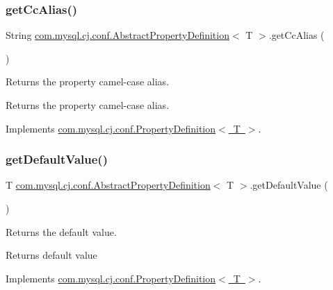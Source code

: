 \subsubsection{\texorpdfstring{get\+Cc\+Alias()}{getCcAlias()}}
{\footnotesize\ttfamily String \mbox{\hyperlink{classcom_1_1mysql_1_1cj_1_1conf_1_1_abstract_property_definition}{com.\+mysql.\+cj.\+conf.\+Abstract\+Property\+Definition}}$<$ T $>$.get\+Cc\+Alias (\begin{DoxyParamCaption}{ }\end{DoxyParamCaption})}

Returns the property camel-\/case alias.

\begin{DoxyReturn}{Returns}
the property camel-\/case alias. 
\end{DoxyReturn}


Implements \mbox{\hyperlink{interfacecom_1_1mysql_1_1cj_1_1conf_1_1_property_definition_acc0fa0247711c6fdacc8eff41cf31259}{com.\+mysql.\+cj.\+conf.\+Property\+Definition$<$ T $>$}}.

\mbox{\label{classcom_1_1mysql_1_1cj_1_1conf_1_1_abstract_property_definition_a3ed1c7b670a446214f7e08b450c8688c}} 
\subsubsection{\texorpdfstring{get\+Default\+Value()}{getDefaultValue()}}
{\footnotesize\ttfamily T \mbox{\hyperlink{classcom_1_1mysql_1_1cj_1_1conf_1_1_abstract_property_definition}{com.\+mysql.\+cj.\+conf.\+Abstract\+Property\+Definition}}$<$ T $>$.get\+Default\+Value (\begin{DoxyParamCaption}{ }\end{DoxyParamCaption})}

Returns the default value.

\begin{DoxyReturn}{Returns}
default value 
\end{DoxyReturn}


Implements \mbox{\hyperlink{interfacecom_1_1mysql_1_1cj_1_1conf_1_1_property_definition_a8e30238016964be2b882a2a9cbffc6a1}{com.\+mysql.\+cj.\+conf.\+Property\+Definition$<$ T $>$}}.

